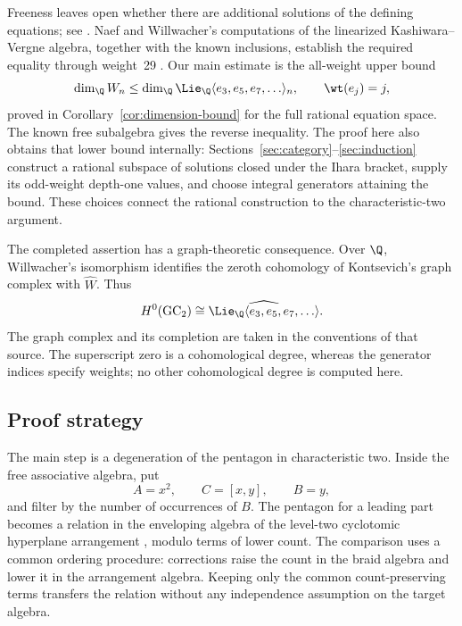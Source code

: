 Freeness leaves open whether there are additional solutions of the
defining equations; see \cite[Section~9]{Willwacher}.
Naef and Willwacher's computations of the linearized
Kashiwara--Vergne algebra, together with the known inclusions,
establish the required equality through weight~29
\cite[Theorem~5 and Corollary~7]{NaefWillwacher}.
Our main estimate is the all-weight upper bound
\[
 \dim_{\Q}W_n\leq
 \dim_{\Q}\Lie_{\Q}\langle e_3,e_5,e_7,\ldots\rangle_n,
 \qquad \wt(e_j)=j,
\]
proved in Corollary~\ref{cor:dimension-bound} for the full rational
equation space.  The known free subalgebra gives the reverse inequality.
The proof here also obtains that lower bound internally:
Sections~\ref{sec:category}--\ref{sec:induction} construct a rational
subspace of solutions closed under the Ihara bracket, supply its
odd-weight depth-one values, and choose integral generators attaining
the bound.  These choices connect the rational construction to the
characteristic-two argument.

The completed assertion has a graph-theoretic consequence.  Over
\(\Q\), Willwacher's isomorphism
\cite[Theorem~1.1]{Willwacher} identifies the zeroth cohomology of
Kontsevich's graph complex with \(\widehat W\).  Thus
\[
 H^0(\mathrm{GC}_2)\cong
 \widehat{\Lie_{\Q}\langle e_3,e_5,e_7,\ldots\rangle}.
\]
The graph complex and its completion are taken in the conventions of
that source.  The superscript zero is a cohomological degree, whereas
the generator indices specify weights; no other cohomological degree
is computed here.

\subsection{Proof strategy}

The main step is a degeneration of the pentagon in characteristic two.
Inside the free associative algebra, put
\[
 A=x^2,\qquad C=[x,y],\qquad B=y,
\]
and filter by the number of occurrences of \(B\).
The pentagon for a leading part becomes a relation in the enveloping
algebra of the level-two cyclotomic hyperplane arrangement
\cite[Section~1.4]{Enriquez}, modulo terms of lower count.
The comparison uses a common ordering procedure: corrections
raise the count in the braid algebra and lower it in the arrangement
algebra.  Keeping only the common count-preserving terms transfers the
relation without any independence assumption on the target algebra.

